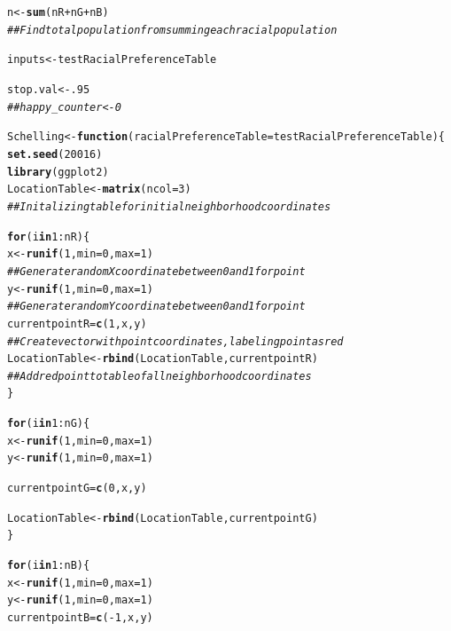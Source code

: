\documentclass{article}\usepackage[]{graphicx}\usepackage[]{color}
\makeatletter
\newcommand{\hlnum}[1]{\textcolor[rgb]{0.686,0.059,0.569}{#1}}%
\newcommand{\hlcom}[1]{\textcolor[rgb]{0.678,0.584,0.686}{\textit{#1}}}%
\newcommand{\hlopt}[1]{\textcolor[rgb]{0,0,0}{#1}}%
\newcommand{\hlstd}[1]{\textcolor[rgb]{0.345,0.345,0.345}{#1}}%
\newcommand{\hlkwa}[1]{\textcolor[rgb]{0.161,0.373,0.58}{\textbf{#1}}}%
\newcommand{\hlkwb}[1]{\textcolor[rgb]{0.69,0.353,0.396}{#1}}%
\newcommand{\hlkwc}[1]{\textcolor[rgb]{0.333,0.667,0.333}{#1}}%
\newcommand{\hlkwd}[1]{\textcolor[rgb]{0.737,0.353,0.396}{\textbf{#1}}}%
\newenvironment{kframe}{%
 \def\at@end@of@kframe{}%
 \ifinner\ifhmode%
  \def\at@end@of@kframe{\end{minipage}}%
  \begin{minipage}{\columnwidth}%
 \fi\fi%
 \def\FrameCommand##1{\hskip\@totalleftmargin \hskip-\fboxsep
 \colorbox{shadecolor}{##1}\hskip-\fboxsep
     \hskip-\linewidth \hskip-\@totalleftmargin \hskip\columnwidth}%
 \MakeFramed {\advance\hsize-\width
   \@totalleftmargin\z@ \linewidth\hsize
   \@setminipage}}%
 {\par\unskip\endMakeFramed%
 \at@end@of@kframe}
\newenvironment{knitrout}{}{} %
\makeatother
\begin{document}
\begin{knitrout}
\begin{kframe}
\begin{alltt}
\hlstd{n} \hlkwb{<-} \hlkwd{sum}\hlstd{(nR} \hlopt{+} \hlstd{nG} \hlopt{+} \hlstd{nB)}
\hlcom{## Find total population from summing each racial population}

\hlstd{inputs} \hlkwb{<-} \hlstd{testRacialPreferenceTable}

\hlstd{stop.val} \hlkwb{<-} \hlnum{.95}
\hlcom{##happy_counter <- 0}

\hlstd{Schelling} \hlkwb{<-} \hlkwa{function}\hlstd{(}\hlkwc{racialPreferenceTable} \hlstd{= testRacialPreferenceTable)\{}
  \hlkwd{set.seed}\hlstd{(}\hlnum{20016}\hlstd{)}
  \hlkwd{library}\hlstd{(ggplot2)}
  \hlstd{LocationTable} \hlkwb{<-} \hlkwd{matrix}\hlstd{(}\hlkwc{ncol} \hlstd{=} \hlnum{3}\hlstd{)}
  \hlcom{## Initalizing table for initial neighborhood coordinates}

  \hlkwa{for} \hlstd{(i} \hlkwa{in} \hlnum{1}\hlopt{:}\hlstd{nR)\{}
    \hlstd{x} \hlkwb{<-} \hlkwd{runif}\hlstd{(}\hlnum{1}\hlstd{,} \hlkwc{min}\hlstd{=}\hlnum{0}\hlstd{,} \hlkwc{max}\hlstd{=}\hlnum{1}\hlstd{)}
    \hlcom{## Generate random X coordinate between 0 and 1 for point}
    \hlstd{y} \hlkwb{<-} \hlkwd{runif}\hlstd{(}\hlnum{1}\hlstd{,} \hlkwc{min}\hlstd{=}\hlnum{0}\hlstd{,} \hlkwc{max}\hlstd{=}\hlnum{1}\hlstd{)}
    \hlcom{## Generate random Y coordinate between 0 and 1 for point}
    \hlstd{currentpointR} \hlkwb{=} \hlkwd{c}\hlstd{(}\hlnum{1}\hlstd{,x,y)}
    \hlcom{## Create vector with point coordinates, labeling point as red}
    \hlstd{LocationTable} \hlkwb{<-} \hlkwd{rbind}\hlstd{(LocationTable, currentpointR)}
    \hlcom{## Add red point to table of all neighborhood coordinates}
  \hlstd{\}}

  \hlkwa{for} \hlstd{(i} \hlkwa{in} \hlnum{1}\hlopt{:}\hlstd{nG)\{}
    \hlstd{x} \hlkwb{<-} \hlkwd{runif}\hlstd{(}\hlnum{1}\hlstd{,} \hlkwc{min}\hlstd{=}\hlnum{0}\hlstd{,} \hlkwc{max}\hlstd{=}\hlnum{1}\hlstd{)}
    \hlstd{y} \hlkwb{<-} \hlkwd{runif}\hlstd{(}\hlnum{1}\hlstd{,} \hlkwc{min}\hlstd{=}\hlnum{0}\hlstd{,} \hlkwc{max}\hlstd{=}\hlnum{1}\hlstd{)}

    \hlstd{currentpointG} \hlkwb{=} \hlkwd{c}\hlstd{(}\hlnum{0}\hlstd{,x,y)}

    \hlstd{LocationTable} \hlkwb{<-} \hlkwd{rbind}\hlstd{(LocationTable, currentpointG)}
  \hlstd{\}}

  \hlkwa{for} \hlstd{(i} \hlkwa{in} \hlnum{1}\hlopt{:}\hlstd{nB)\{}
    \hlstd{x} \hlkwb{<-} \hlkwd{runif}\hlstd{(}\hlnum{1}\hlstd{,} \hlkwc{min}\hlstd{=}\hlnum{0}\hlstd{,} \hlkwc{max}\hlstd{=}\hlnum{1}\hlstd{)}
    \hlstd{y} \hlkwb{<-} \hlkwd{runif}\hlstd{(}\hlnum{1}\hlstd{,} \hlkwc{min}\hlstd{=}\hlnum{0}\hlstd{,} \hlkwc{max}\hlstd{=}\hlnum{1}\hlstd{)}
    \hlstd{currentpointB} \hlkwb{=} \hlkwd{c}\hlstd{(}\hlopt{-}\hlnum{1}\hlstd{,x,y)}


\end{alltt}
\end{kframe}
\end{knitrout}
\end{document}
